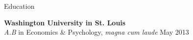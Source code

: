 \begin{rSection}{\textrm{Education}}
\begin{comment}
Summer Scholar\hfill{Summer 2014}\\
\hspace*{\pindent}Interuniversity Consortium for Political and Social Research\medskip\\\end{comment}
{\bf Washington University in St. Louis}\\
{\em A.B} in Economics \& Psychology, \textit{magna cum laude} \hfill{May 2013}%
\end{rSection}
